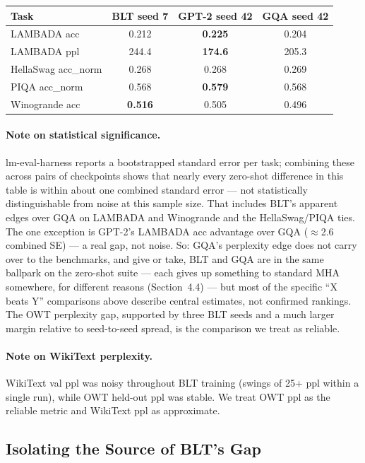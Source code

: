 \documentclass[11pt]{article}
\begin{document}
\begin{center}
\begin{tabular}{lccc}
\toprule
Task & BLT seed 7 & GPT-2 seed 42 & GQA seed 42 \\
\midrule
LAMBADA acc & 0.212 & \textbf{0.225} & 0.204 \\
LAMBADA ppl & 244.4 & \textbf{174.6} & 205.3 \\
HellaSwag acc\_norm & 0.268 & 0.268 & 0.269 \\
PIQA acc\_norm & 0.568 & \textbf{0.579} & 0.568 \\
Winogrande acc & \textbf{0.516} & 0.505 & 0.496 \\
\bottomrule
\end{tabular}
\end{center}

\paragraph{Note on statistical significance.} lm-eval-harness reports a bootstrapped standard error per task; combining these across pairs of checkpoints shows that nearly every zero-shot difference in this table is within about one combined standard error --- not statistically distinguishable from noise at this sample size. That includes BLT's apparent edges over GQA on LAMBADA and Winogrande and the HellaSwag/PIQA ties. The one exception is GPT-2's LAMBADA acc advantage over GQA ($\approx$2.6 combined SE) --- a real gap, not noise. So: GQA's perplexity edge does not carry over to the benchmarks, and give or take, BLT and GQA are in the same ballpark on the zero-shot suite --- each gives up something to standard MHA somewhere, for different reasons (Section~4.4) --- but most of the specific ``X beats Y'' comparisons above describe central estimates, not confirmed rankings. The OWT perplexity gap, supported by three BLT seeds and a much larger margin relative to seed-to-seed spread, is the comparison we treat as reliable.

\paragraph{Note on WikiText perplexity.} WikiText val ppl was noisy throughout BLT training (swings of 25+ ppl within a single run), while OWT held-out ppl was stable. We treat OWT ppl as the reliable metric and WikiText ppl as approximate.

\subsection{Isolating the Source of BLT's Gap}
\end{document}
